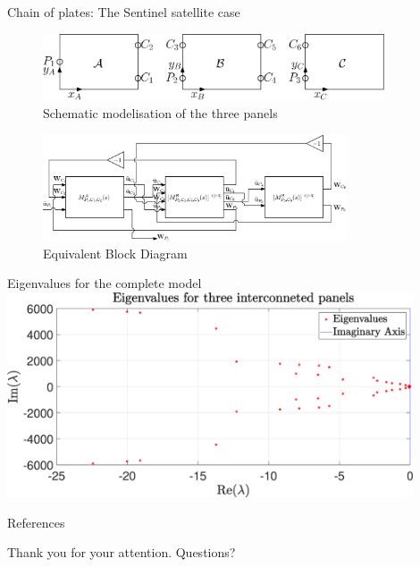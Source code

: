 \documentclass{beamer}
\begin{document}
\begin{frame}{Chain of plates: The Sentinel satellite case}	

\begin{figure}
	\centering
	\includegraphics[width=0.9\textwidth]{Three_panels.eps}
	\caption{Schematic modelisation of the three panels}
\end{figure}
\begin{figure}
	\centering
	\includegraphics[width=0.8\textwidth]{Three_panels_BlockDiagram.eps}
	\caption{Equivalent Block Diagram}
\end{figure}
	
\end{frame}


\begin{frame}{Eigenvalues for the complete model}
	\centering
	\includegraphics[width=0.9\textwidth]{Eigen_3panels.eps}
\end{frame}

\begin{frame}[allowframebreaks]{References}
\footnotesize

\nocite{*}

\end{frame}

\begin{frame}
\centering
Thank you for your attention. Questions?
\end{frame}
\end{document}
